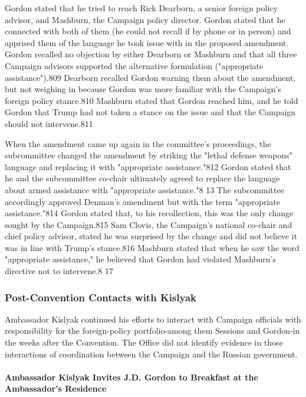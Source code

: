 Gordon stated that he tried to reach Rick Dearborn,  a  senior foreign policy advisor, and Mashburn, the Campaign policy director. Gordon stated that he connected with both of them (he could not recall if by phone or in person) and apprised them of the language he took issue with in the proposed amendment. Gordon recalled no objection by either Dearborn or Mashburn and that all three Campaign advisors supported the alternative formulation ("appropriate assistance").809 Dearborn recalled Gordon warning them about the amendment, but not weighing in because Gordon was more familiar with the Campaign's foreign policy stance.810 Mashburn stated that Gordon reached him, and he told Gordon that Trump had not taken a stance on the issue and that the Campaign should not intervene.811

When the amendment came up again in the committee's proceedings, the subcommittee changed the amendment by striking the "lethal defense weapons" language and replacing it with "appropriate assistance."812 Gordon stated that he and the subcommittee co-chair ultimately agreed to replace the language about armed assistance with "appropriate assistance."8 13 The subcommittee accordingly approved Denman's amendment but with the term "appropriate assistance."814 Gordon stated that, to his recollection, this was the only change sought by the Campaign.815 Sam Clovis, the Campaign's national co-chair and chief policy advisor, stated he was surprised by the change and did not believe it was in line with Trump's stance.816 Mashburn stated that when he saw the word "appropriate assistance,"  he believed that Gordon had violated Mashburn's directive not to intervene.8 17

\subsubsection{Post-Convention Contacts with Kislyak}

Ambassador Kislyak continued his efforts to interact with Campaign officials with responsibility for the foreign-policy portfolio-among them Sessions and Gordon-in the weeks after the Convention. The Office did not identify evidence in those interactions of coordination between the Campaign and the Russian government.

\paragraph{Ambassador Kislyak Invites J.D. Gordon to Breakfast at the Ambassador's Residence}

